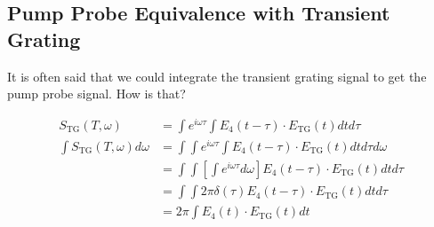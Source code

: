 \subsection{Pump Probe Equivalence with Transient Grating}
It is often said that we could integrate the transient grating signal to get the pump probe signal.  How is that?

\begin{align}
	S_{\text{TG}} (T, \omega)  &= \int e^{i \omega \tau} \int  E_4 (t - \tau) \cdot E_{\text{TG}} (t) dt  d\tau \\
	\int S_{\text{TG}} (T, \omega) d \omega &=\int \int e^{i \omega \tau} \int  E_4 (t - \tau) \cdot E_{\text{TG}} (t) dt  d\tau d\omega \\
	&= \int \int \left[ \int e^{i \omega \tau} d\omega \right]   E_4 (t - \tau) \cdot E_{\text{TG}} (t) dt  d\tau \\
	&= \int \int  2 \pi \delta (\tau)   E_4 (t - \tau) \cdot E_{\text{TG}} (t) dt  d\tau \\
	&= 2 \pi \int   E_4 (t ) \cdot E_{\text{TG}} (t) dt
\end{align}

